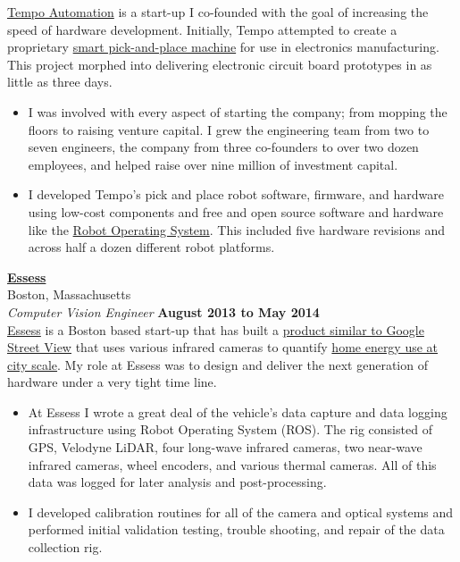 \documentclass[10pt]{article}
\newenvironment{outerlist}[1][\enskip\textbullet]%
        {\begin{itemize}[#1]}{\end{itemize}%
         \vspace{-.6\baselineskip}}
\newcommand{\blankline}{\quad\pagebreak[2]}
\begin{document}
\blankline
\newline
\href{http://www.tempoautomation.com/}{Tempo Automation} is a start-up I co-founded with the goal of increasing the speed of hardware development. Initially, Tempo attempted to create a proprietary \href{http://radar.oreilly.com/2014/10/intoxicating-machines.html}{smart pick-and-place machine} for use in electronics manufacturing. This project morphed into delivering electronic circuit board prototypes in as little as three days.  
\\
\begin{outerlist}
\item I was involved with every aspect of starting the company; from mopping the floors to raising venture capital. I grew the engineering team from two to seven engineers, the company from three co-founders to over two dozen employees, and helped raise over nine million of investment capital.  
\item I developed Tempo's pick and place robot software, firmware, and hardware using low-cost components and free and open source software and hardware like the \href{http://www.ros.org/}{Robot Operating System}. This included five hardware revisions and across half a dozen different robot platforms. 
\end{outerlist}
\blankline
\newline
\href{http://www.essess.com/}{\textbf{Essess}} \\
Boston, Massachusetts \\
\textit{Computer Vision Engineer}%
        \hfill \textbf{August 2013 to May 2014}  \\

\blankline
\href{http://www.essess.com/}{Essess} is a Boston based start-up that has built a \href{http://news.mit.edu/2015/startup-essess-heat-mapping-cars-0105}{product similar to Google Street View} that uses various infrared cameras to quantify \href{http://blogs.wsj.com/venturecapital/2014/11/20/heat-mapping-startup-essess-picks-up-10-8-million-to-scan-for-energy-leaks/}{home energy use at city scale}. My role at Essess was to design and deliver the next generation of hardware under a very tight time line. 
\\
\begin{outerlist}
\item At Essess I wrote a great deal of the vehicle's data capture and data logging infrastructure using Robot Operating System (ROS). The rig consisted of GPS, Velodyne LiDAR, four long-wave infrared cameras, two near-wave infrared cameras, wheel encoders, and various thermal cameras. All of this data was logged for later analysis and  post-processing. 
\item I developed calibration routines for all of the camera and optical systems and performed initial validation testing, trouble shooting, and repair of the data collection rig.  
\newline
\end{outerlist}
\blankline
\newline
\end{document}
